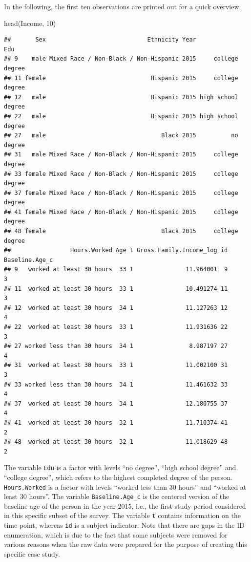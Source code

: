\documentclass[a4paper, preprint, 3p,
authoryear]{elsarticle} %
\newenvironment{Shaded}{\begin{snugshade}}{\end{snugshade}}
\newcommand{\NormalTok}[1]{#1}
\begin{document}
In the following, the first ten observations are printed out for a quick
overview.

\begin{Shaded}
\begin{Highlighting}[]
\NormalTok{head(Income, 10)}
\end{Highlighting}
\end{Shaded}

\begin{verbatim}
##       Sex                             Ethnicity Year                Edu
## 9    male Mixed Race / Non-Black / Non-Hispanic 2015     college degree
## 11 female                              Hispanic 2015     college degree
## 12   male                              Hispanic 2015 high school degree
## 22   male                              Hispanic 2015 high school degree
## 27   male                                 Black 2015          no degree
## 31   male Mixed Race / Non-Black / Non-Hispanic 2015     college degree
## 33 female Mixed Race / Non-Black / Non-Hispanic 2015     college degree
## 37 female Mixed Race / Non-Black / Non-Hispanic 2015     college degree
## 41 female Mixed Race / Non-Black / Non-Hispanic 2015     college degree
## 48 female                                 Black 2015     college degree
##                 Hours.Worked Age t Gross.Family.Income_log id Baseline.Age_c
## 9   worked at least 30 hours  33 1               11.964001  9              3
## 11  worked at least 30 hours  33 1               10.491274 11              3
## 12  worked at least 30 hours  34 1               11.127263 12              4
## 22  worked at least 30 hours  33 1               11.931636 22              3
## 27 worked less than 30 hours  34 1                8.987197 27              4
## 31  worked at least 30 hours  33 1               11.002100 31              3
## 33 worked less than 30 hours  34 1               11.461632 33              4
## 37  worked at least 30 hours  34 1               12.180755 37              4
## 41  worked at least 30 hours  32 1               11.710374 41              2
## 48  worked at least 30 hours  32 1               11.018629 48              2
\end{verbatim}

The variable \texttt{Edu} is a factor with levels ``no degree'', ``high
school degree'' and ``college degree'', which refers to the highest
completed degree of the person. \texttt{Hours.Worked} is a factor with
levels ``worked less than 30 hours'' and ``worked at least 30 hours''.
The variable \texttt{Baseline.Age\_c} is the centered version of the
baseline age of the person in the year 2015, i.e., the first study
period considered in this specific subset of the survey. The variable
\texttt{t} contains information on the time point, whereas \texttt{id}
is a subject indicator. Note that there are gaps in the ID enumeration,
which is due to the fact that some subjects were removed for various
reasons when the raw data were prepared for the purpose of creating this
specific case study.
\end{document}
